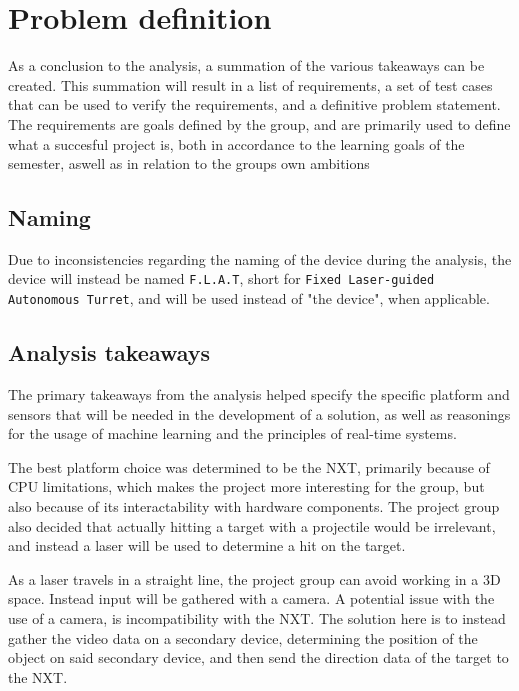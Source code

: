 \newpage
\section{Problem definition}
As a conclusion to the analysis, a summation of the various takeaways can be created. 
This summation will result in a list of requirements, a set of test cases that can be used to verify the requirements, and a definitive problem statement.
The requirements are goals defined by the group, and are primarily used to define what a succesful project is, both in accordance to the learning goals of the semester, aswell as in relation to the groups own ambitions

\subsection{Naming}
Due to inconsistencies regarding the naming of the device during the analysis, the device will instead be named \texttt{F.L.A.T}, short for \texttt{Fixed Laser-guided Autonomous Turret}, and will be used instead of "the device", when applicable.

\subsection{Analysis takeaways}
The primary takeaways from the analysis helped specify the specific platform and sensors that will be needed in the development of a solution, as well as reasonings for the usage of machine learning and the principles of real-time systems.

The best platform choice was determined to be the NXT, primarily because of CPU limitations, which makes the project more interesting for the group, but also because of its interactability with hardware components.
The project group also decided that actually hitting a target with a projectile would be irrelevant, and instead a laser will be used to determine a hit on the target.

As a laser travels in a straight line, the project group can avoid working in a 3D space.
Instead input will be gathered with a camera.
A potential issue with the use of a camera, is incompatibility with the NXT.
The solution here is to instead gather the video data on a secondary device, determining the position of the object on said secondary device, and then send the direction data of the target to the NXT.

